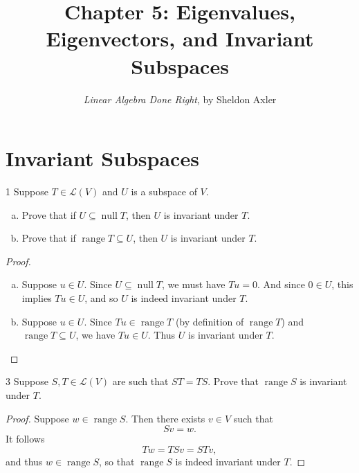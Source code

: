 \documentclass[11pt]{extarticle}
\title{\vspace{-2em}Chapter 5: Eigenvalues, Eigenvectors, and Invariant Subspaces}
\author{\emph{Linear Algebra Done Right}, by Sheldon Axler}
\newenvironment{problem}[1]{\begin{prob*}{#1}{}}{\end{prob*}}
\newcommand{\Hom}{\mathcal{L}}
\DeclareMathOperator{\Null}{null}
\DeclareMathOperator{\Range}{range}
\begin{document}
\maketitle



\section{Invariant Subspaces}

\begin{problem}{1}
Suppose $T\in\Hom(V)$ and $U$ is a subspace of $V$.
\begin{enumerate}[(a)]
\item Prove that if $U\subseteq \Null T$, then $U$ is invariant under $T$.
\item Prove that if $\Range T\subseteq U$, then $U$ is invariant under $T$.
\end{enumerate}
\end{problem}
\begin{proof}
\begin{enumerate}[(a)]
\item Suppose $u\in U$.  Since $U\subseteq\Null T$, we must have $Tu = 0$. And since $0\in U$, this implies $Tu\in U$, and so $U$ is indeed invariant under $T$.
\item Suppose $u\in U$.  Since $Tu\in \Range T$ (by definition of $\Range T$) and $\Range T\subseteq U$, we have $Tu\in U$.  Thus $U$ is invariant under $T$.  
\end{enumerate}
\end{proof}

\begin{problem}{3}
Suppose $S,T\in\Hom(V)$ are such that $ST = TS$.  Prove that $\Range S$ is invariant under $T$.
\end{problem}
\begin{proof}
Suppose $w\in\Range S$.  Then there exists $v\in V$ such that
\begin{equation*}
Sv = w.
\end{equation*}
It follows
\begin{equation*}
Tw = TSv = STv,
\end{equation*}
and thus $w\in \Range S$, so that $\Range S$ is indeed invariant under $T$.
\end{proof}
\end{document}
